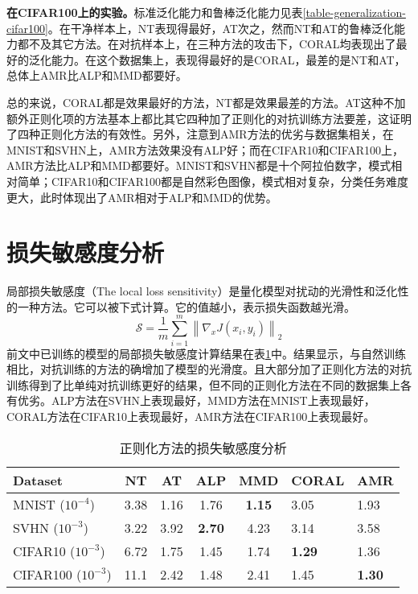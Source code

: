 \clearpage

\textbf{在CIFAR100上的实验。}标准泛化能力和鲁棒泛化能力见表\ref{table-generalization-cifar100}。在干净样本上，NT表现得最好，AT次之，然而NT和AT的鲁棒泛化能力都不及其它方法。在对抗样本上，在三种方法的攻击下，CORAL均表现出了最好的泛化能力。在这个数据集上，表现得最好的是CORAL，最差的是NT和AT，总体上AMR比ALP和MMD都要好。

总的来说，CORAL都是效果最好的方法，NT都是效果最差的方法。AT这种不加额外正则化项的方法基本上都比其它四种加了正则化的对抗训练方法要差，这证明了四种正则化方法的有效性。另外，注意到AMR方法的优劣与数据集相关，在MNIST和SVHN上，AMR方法效果没有ALP好；而在CIFAR10和CIFAR100上，AMR方法比ALP和MMD都要好。MNIST和SVHN都是十个阿拉伯数字，模式相对简单；CIFAR10和CIFAR100都是自然彩色图像，模式相对复杂，分类任务难度更大，此时体现出了AMR相对于ALP和MMD的优势。

\section{损失敏感度分析}

局部损失敏感度（The local loss sensitivity）是量化模型对扰动的光滑性和泛化性的一种方法。它可以被下式计算。它的值越小，表示损失函数越光滑。
\begin{equation}
    \mathcal{S}=\frac{1}{m} \sum_{i=1}^{m}\left\|\nabla_{x} J\left(x_{i}, y_{i}\right)\right\|_{2}
\end{equation}
前文中已训练的模型的局部损失敏感度计算结果在表\ref{table-loss_sensitivity}中。结果显示，与自然训练相比，对抗训练的方法的确增加了模型的光滑度。且大部分加了正则化方法的对抗训练得到了比单纯对抗训练更好的结果，但不同的正则化方法在不同的数据集上各有优劣。ALP方法在SVHN上表现最好，MMD方法在MNIST上表现最好，CORAL方法在CIFAR10上表现最好，AMR方法在CIFAR100上表现最好。

\begin{table}[h]
    \renewcommand\arraystretch{0.6}
    \renewcommand\heavyrulewidth{0.1em}
    \renewcommand\lightrulewidth{0.05em}
    
    \caption{正则化方法的损失敏感度分析} 
    \label{table-loss_sensitivity}
    \centering

    \begin{tabular}{lccccll}
    \toprule
    Dataset            & NT   & AT   & ALP           & MMD           & CORAL         & AMR           \\ \midrule
    MNIST ($10^{-4}$)    & 3.38 & 1.16 & 1.76          & \textbf{1.15} & 3.05          & 1.93          \\
    SVHN ($10^{-3}$)     & 3.22 & 3.92 & \textbf{2.70} & 4.23          & 3.14          & 3.58          \\
    CIFAR10 ($10^{-3}$)  & 6.72 & 1.75 & 1.45          & 1.74          & \textbf{1.29} & 1.36          \\
    CIFAR100 ($10^{-3}$) & 11.1 & 2.42 & 1.48          & 2.41          & 1.45          & \textbf{1.30} \\ \bottomrule
    \end{tabular}
\end{table}

